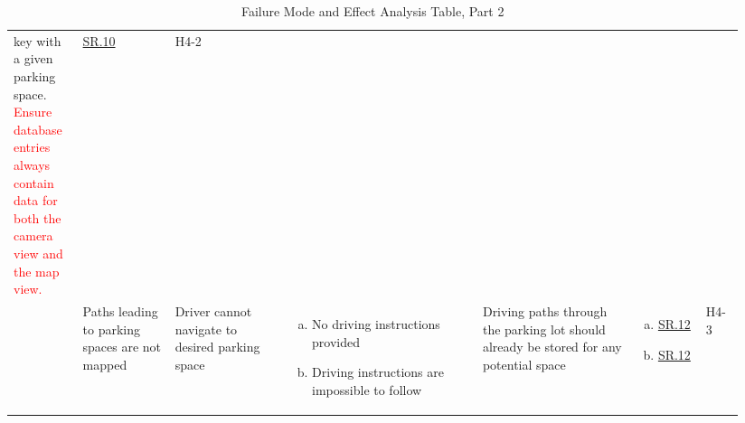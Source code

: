 \documentclass[12pt,letterpaper]{article}
\begin{document}
\begin{landscape}
\begin{table}[hp]
\begin{tabular}{|p{0.09\linewidth}|p{0.12\linewidth}|p{0.15\linewidth}|p{0.25\linewidth}|p{0.2\linewidth}|p{0.075\linewidth}|p{0.05\linewidth}|}
key with a given parking space. \textcolor{red}{Ensure database entries always
contain data for both the camera view and the map view.} &
\hyperref[isr10]{SR.10} & H4-2\\\cline{2-7} & Paths leading to parking spaces
are not mapped & Driver cannot navigate to desired parking space &
\begin{enumerate}[a., leftmargin=0.5cm, noitemsep, nolistsep] \item No driving
instructions provided \item Driving instructions are impossible to follow
\end{enumerate} & Driving paths through the parking lot should already be stored
for any potential space & \begin{enumerate}[a., leftmargin=0.5cm, noitemsep,
nolistsep]\item \hyperref[isr12]{SR.12} \item
\hyperref[isr12]{SR.12}\end{enumerate}& H4-3\\
\hline
\end{tabular}
\caption{Failure Mode and Effect Analysis Table, Part 2} \label{TblFMEA2}
\end{table}


\end{landscape}
\end{document}
